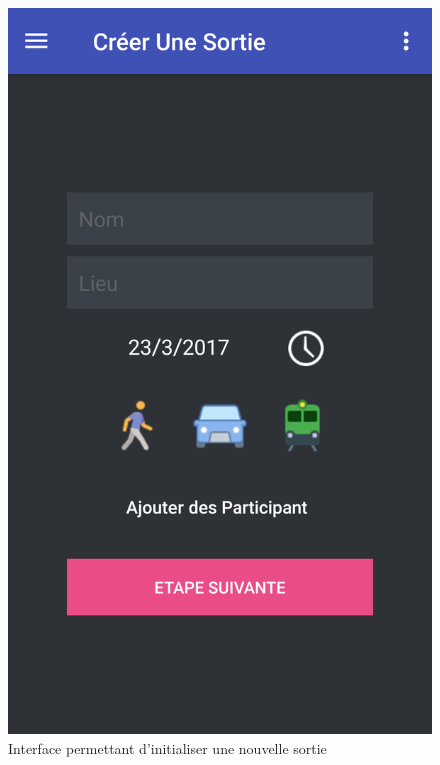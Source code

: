 \documentclass[a4paper, 12pt, notitlepage]{article} %
\begin{document}
\vfill
\begin{figure}[!htb]
    \centering
    \includegraphics[height=0.4\textheight]{Interface_Creer_Sortie.png}
    \caption[]{Interface permettant d’initialiser une nouvelle sortie}
    \label{interface:CreerSortie}
\end{figure}
\vfill
\end{document}
